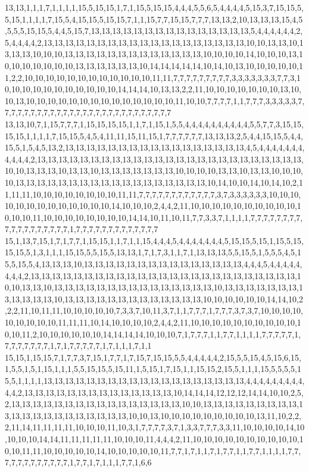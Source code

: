 13,13,1,1,1,7,1,1,1,1,15,5,15,15,1,7,1,15,5,15,15,4,4,4,5,5,6,5,4,4,4,4,5,15,3,7,15,15,5,5,15,1,1,1,1,7,15,5,4,15,15,5,15,15,7,1,1,15,7,7,15,15,7,7,7,13,13,2,10,13,13,13,15,4,5,5,5,5,15,15,5,4,4,5,15,7,13,13,13,13,13,13,13,13,13,13,13,13,13,13,13,5,4,4,4,4,4,4,2,5,4,4,4,4,2,13,13,13,13,13,13,13,13,13,13,13,13,13,13,13,13,13,13,13,10,10,13,13,10,13,13,13,10,10,10,13,13,13,13,13,13,13,13,13,13,13,13,13,10,10,10,10,14,10,10,10,13,10,10,10,10,10,10,10,13,13,13,13,13,13,10,14,14,14,14,14,10,14,10,13,10,10,10,10,10,11,2,2,10,10,10,10,10,10,10,10,10,10,10,10,11,11,7,7,7,7,7,7,7,7,7,3,3,3,3,3,3,3,7,7,3,10,10,10,10,10,10,10,10,10,10,10,14,14,14,10,13,13,2,2,11,10,10,10,10,10,10,10,13,10,10,13,10,10,10,10,10,10,10,10,10,10,10,10,10,10,11,10,10,7,7,7,7,1,1,7,7,7,3,3,3,3,3,7,7,7,7,7,7,7,7,7,7,7,7,7,7,7,7,7,7,7,7,7,7,7,7,7,7,7
13,13,10,7,1,15,7,7,7,1,15,15,15,15,1,1,7,1,15,1,5,5,4,4,4,4,4,4,4,4,4,4,5,5,7,7,3,15,15,15,15,1,1,1,1,7,15,15,5,4,5,4,11,11,15,11,15,1,7,7,7,7,7,7,13,13,13,2,5,4,4,15,15,5,4,4,15,5,1,5,4,5,13,2,13,13,13,13,13,13,13,13,13,13,13,13,13,13,13,13,13,4,5,4,4,4,4,4,4,4,4,4,4,4,2,13,13,13,13,13,13,13,13,13,13,13,13,13,13,13,13,13,13,13,13,13,13,13,13,13,10,10,13,13,13,10,13,13,10,13,13,13,13,13,13,13,10,10,10,10,13,13,10,13,13,10,10,10,10,13,13,13,13,13,13,13,13,13,13,13,13,13,13,13,13,13,13,10,14,10,10,14,10,14,10,2,11,11,11,10,10,10,10,10,10,10,10,11,11,7,7,7,7,7,7,7,7,7,7,7,7,3,7,3,3,3,3,3,3,10,10,10,10,10,10,10,10,10,10,10,10,10,14,10,10,10,2,4,4,2,11,10,10,10,10,10,10,10,10,10,10,10,10,10,11,10,10,10,10,10,10,10,10,14,14,10,11,10,11,7,7,3,3,7,1,1,1,1,7,7,7,7,7,7,7,7,7,7,7,7,7,7,7,7,7,7,1,7,7,7,7,7,7,7,7,7,7,7,7,7
15,1,13,7,15,1,7,1,7,7,1,15,15,1,1,7,1,1,15,4,4,4,5,4,4,4,4,4,4,4,5,15,15,5,15,1,15,5,15,15,15,5,1,3,1,1,1,15,15,5,5,15,5,13,13,1,7,1,7,3,1,1,7,1,13,13,13,5,5,15,5,1,5,5,5,4,5,15,5,15,5,4,13,13,13,10,13,13,13,13,13,13,13,13,13,13,13,13,13,13,13,4,4,4,5,4,4,4,4,4,4,4,4,2,13,13,13,13,13,13,13,13,13,13,13,13,13,13,13,13,13,13,13,13,13,13,13,13,13,10,10,13,13,10,13,13,13,13,13,13,13,13,13,13,13,13,13,13,13,10,13,13,13,13,13,13,13,13,13,13,13,13,10,13,13,13,13,13,13,13,13,13,13,13,13,13,10,10,10,10,10,10,14,14,10,2,2,2,11,10,11,11,10,10,10,10,10,7,3,3,7,10,11,3,7,1,1,7,7,7,1,7,7,7,3,7,3,7,10,10,10,10,10,10,10,10,10,11,11,11,10,14,10,10,10,10,2,4,4,2,11,10,10,10,10,10,10,10,10,10,10,10,10,11,2,10,10,10,10,10,10,14,14,14,14,10,10,10,7,1,7,7,7,1,1,7,7,1,1,1,1,7,7,7,7,7,1,7,7,7,7,7,7,7,1,7,1,7,7,7,7,7,1,7,1,1,1,7,1,1
15,15,1,15,15,7,1,7,7,3,7,15,1,7,7,1,7,15,7,15,15,5,5,4,4,4,4,4,2,15,5,5,15,4,5,15,6,15,1,5,5,1,5,1,15,1,1,1,5,5,15,15,5,15,11,1,5,15,1,7,15,1,1,15,15,2,15,5,1,1,1,15,5,5,5,5,15,5,1,1,1,1,13,13,13,13,13,13,13,13,13,13,13,13,13,13,13,13,13,13,13,4,4,4,4,4,4,4,4,4,4,4,2,13,13,13,13,13,13,13,13,13,13,13,13,13,13,10,14,14,14,12,12,12,14,14,10,10,2,5,2,13,13,13,13,13,13,13,13,13,13,13,13,13,13,13,13,10,10,13,13,13,13,13,13,13,13,13,13,13,13,13,13,13,13,13,13,13,13,13,10,10,13,10,10,10,10,10,10,10,10,10,13,11,10,2,2,2,11,14,11,11,11,11,10,10,10,11,10,3,1,7,7,7,7,3,7,1,3,3,7,7,7,3,3,11,10,10,10,10,14,10,10,10,10,14,14,11,11,11,11,11,10,10,10,11,4,4,4,2,11,10,10,10,10,10,10,10,10,10,10,10,10,11,11,10,10,10,10,10,14,10,10,10,10,10,11,7,7,1,7,1,1,7,1,7,7,1,1,7,7,1,1,1,1,7,7,7,7,7,7,7,7,7,7,7,7,1,7,7,1,7,1,1,1,7,7,1,6,6
